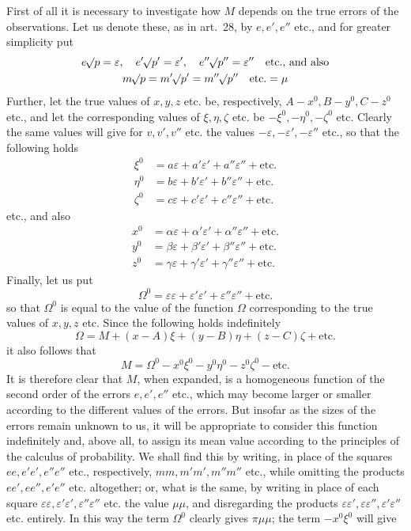 First of all it is necessary to investigate how \(M\) depends on the true errors of the observations. Let us denote these, as in art.\ 28, by \(e,e',e''\) etc., and for greater simplicity put
\[
\begin{gathered}
e\mathord{{}^{}\!\surd}p=\varepsilon,\quad e'\mathord{{}^{}\!\surd}p'=\varepsilon',\quad e''\mathord{{}^{}\!\surd}p''=\varepsilon''\quad\text{etc., and also}\\
m\mathord{{}^{}\!\surd}p=m'\mathord{{}^{}\!\surd}p'=m''\mathord{{}^{}\!\surd}p''\quad\text{etc.}=\mu
\end{gathered}
\]
Further, let the true values of \(x,y,z\) etc. be, respectively, \(A-x^0,\allowbreak B-y^0,\allowbreak C-z^0\) etc., and let the corresponding values of \(\xi,\eta,\zeta\) etc. be \(-\xi^0,-\eta^0,-\zeta^0\) etc. Clearly the same values will give for \(v,v',v''\) etc. the values \(-\varepsilon,-\varepsilon',-\varepsilon''\) etc., so that the following holds
\[
\begin{aligned}
\xi^0&=a\varepsilon+a'\varepsilon'+a''\varepsilon''+\text{etc.}\\
\eta^0&=b\varepsilon+b'\varepsilon'+b''\varepsilon''+\text{etc.}\\
\zeta^0&=c\varepsilon+c'\varepsilon'+c''\varepsilon''+\text{etc.}
\end{aligned}
\]
etc., and also
\[
\begin{aligned}
x^0&=\alpha\varepsilon+\alpha'\varepsilon'+\alpha''\varepsilon''+\text{etc.}\\
y^0&=\beta\varepsilon+\beta'\varepsilon'+\beta''\varepsilon''+\text{etc.}\\
z^0&=\gamma\varepsilon+\gamma'\varepsilon'+\gamma''\varepsilon''+\text{etc.}
\end{aligned}
\]
Finally, let us put
\[
\Omega^0=\varepsilon\varepsilon+\varepsilon'\varepsilon'+\varepsilon''\varepsilon''+\text{etc.}
\]
so that \(\Omega^0\) is equal to the value of the function \(\Omega\) corresponding to the true values of \(x,y,z\) etc. Since the following holds indefinitely
\[
\Omega=M+(x-A)\xi+(y-B)\eta+(z-C)\zeta+\text{etc.}
\]
it also follows that
\[
M=\Omega^0-x^0\xi^0-y^0\eta^0-z^0\zeta^0-\text{etc.}
\]
It is therefore clear that \(M\), when expanded, is a homogeneous function of the second order of the errors \(e,e',e''\) etc., which may become larger or smaller according to the different values of the errors. But insofar as the sizes of the errors remain unknown to us, it will be appropriate to consider this function indefinitely and, above all, to assign its mean value according to the principles of the calculus of probability. We shall find this by writing, in place of the squares \(ee,e'e',e''e''\) etc., respectively, \(mm,m'm',m''m''\) etc., while omitting the products \(ee',ee'',e'e''\) etc. altogether; or, what is the same, by writing in place of each square \(\varepsilon\varepsilon,\varepsilon'\varepsilon',\varepsilon''\varepsilon''\) etc. the value \(\mu\mu\), and disregarding the products \(\varepsilon\varepsilon',\varepsilon\varepsilon'',\varepsilon'\varepsilon''\) etc. entirely. In this way the term \(\Omega^0\) clearly gives \(\pi\mu\mu\); the term \(-x^0\xi^0\) will give
